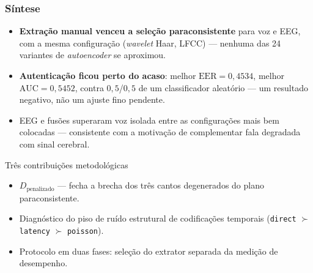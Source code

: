 \begin{frame}
	\frametitle{Síntese}
	\small
	\begin{itemize}
		\item \textbf{Extração manual venceu a seleção paraconsistente} para voz e EEG, com a mesma configuração (\textit{wavelet} Haar, LFCC) --- nenhuma das 24 variantes de \textit{autoencoder} se aproximou.
		\item \textbf{Autenticação ficou perto do acaso}: melhor $\text{EER} = 0{,}4534$, melhor $\text{AUC} = 0{,}5452$, contra $0{,}5$/$0{,}5$ de um classificador aleatório --- um resultado negativo, não um ajuste fino pendente.
		\item EEG e fusões superaram voz isolada entre as configurações mais bem colocadas --- consistente com a motivação de complementar fala degradada com sinal cerebral.
	\end{itemize}
	\begin{block}{Três contribuições metodológicas}
		\begin{itemize}
			\setlength{\itemsep}{0pt}
			\item $D_{\text{penalizado}}$ --- fecha a brecha dos três cantos degenerados do plano paraconsistente.
			\item Diagnóstico do piso de ruído estrutural de codificações temporais (\texttt{direct} $\succ$ \texttt{latency} $\succ$ \texttt{poisson}).
			\item Protocolo em duas fases: seleção do extrator separada da medição de desempenho.
		\end{itemize}
	\end{block}
\end{frame}
